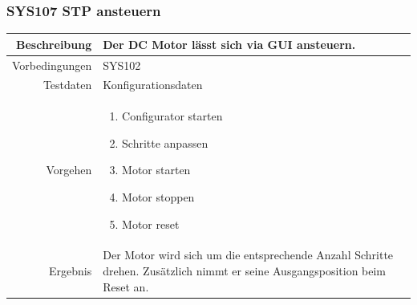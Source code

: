 \subsubsection{SYS107 STP ansteuern}
\begin{table}[h!]
	\renewcommand{\arraystretch}{1.5}
	\begin{tabular}{|r|p{14cm}|}
		\hline Beschreibung & Der DC Motor lässt sich via GUI ansteuern. \\ 
		\hline Vorbedingungen & SYS102 \\ 
		\hline Testdaten & Konfigurationsdaten \\ 
		\hline Vorgehen & 
		\begin{enumerate}
			\item Configurator starten
			\item Schritte anpassen
			\item Motor starten
			\item Motor stoppen
			\item Motor reset
		\end{enumerate} \\ 
		\hline Ergebnis & Der Motor wird sich um die entsprechende Anzahl Schritte drehen. Zusätzlich nimmt er seine Ausgangsposition beim Reset an. \\ 
		\hline 
	\end{tabular}
\end{table}
